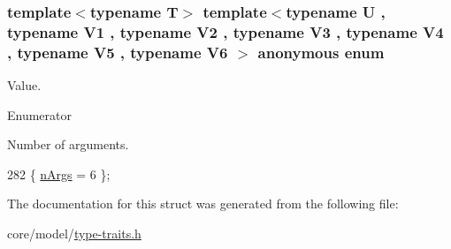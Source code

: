 \subsubsection[{\texorpdfstring{anonymous enum}{anonymous enum}}]{\setlength{\rightskip}{0pt plus 5cm}template$<$typename T$>$ template$<$typename U , typename V1 , typename V2 , typename V3 , typename V4 , typename V5 , typename V6 $>$ anonymous enum}\hypertarget{structTypeTraits_1_1FunctionPtrTraits_3_01U_07_5_08_07V1_00_01V2_00_01V3_00_01V4_00_01V5_00_01V6_08_4_a2f8b308bda1d2b38bdfe79c8a12bc392}{}\label{structTypeTraits_1_1FunctionPtrTraits_3_01U_07_5_08_07V1_00_01V2_00_01V3_00_01V4_00_01V5_00_01V6_08_4_a2f8b308bda1d2b38bdfe79c8a12bc392}
Value. \begin{Desc}
\item[Enumerator]\par
\begin{description}
\item[{\em 
n\+Args\hypertarget{structTypeTraits_1_1FunctionPtrTraits_3_01U_07_5_08_07V1_00_01V2_00_01V3_00_01V4_00_01V5_00_01V6_08_4_a2f8b308bda1d2b38bdfe79c8a12bc392a51e7708e5bdba43999f440c36a28e56d}{}\label{structTypeTraits_1_1FunctionPtrTraits_3_01U_07_5_08_07V1_00_01V2_00_01V3_00_01V4_00_01V5_00_01V6_08_4_a2f8b308bda1d2b38bdfe79c8a12bc392a51e7708e5bdba43999f440c36a28e56d}
}]Number of arguments. \end{description}
\end{Desc}

\begin{DoxyCode}
282 \{ \hyperlink{structTypeTraits_1_1FunctionPtrTraits_3_01U_07_5_08_07V1_00_01V2_00_01V3_00_01V4_00_01V5_00_01V6_08_4_a2f8b308bda1d2b38bdfe79c8a12bc392a51e7708e5bdba43999f440c36a28e56d}{nArgs} = 6                \};
\end{DoxyCode}


The documentation for this struct was generated from the following file\+:\begin{DoxyCompactItemize}
\item 
core/model/\hyperlink{type-traits_8h}{type-\/traits.\+h}\end{DoxyCompactItemize}
